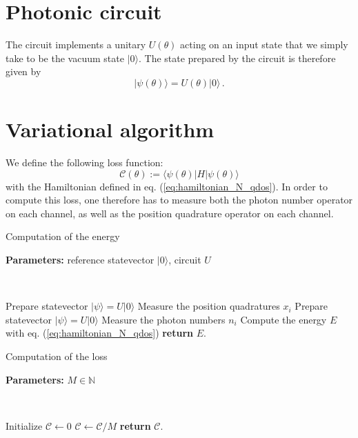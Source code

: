 \documentclass[reprint, amsmath, amssymb, aps]{revtex4-2}
\begin{document}
\section{Photonic circuit}

    The circuit implements a unitary $U(\theta)$ acting on an input state that we simply take to be the vacuum state $|0\rangle$. The state prepared by the circuit is therefore given by
    \begin{equation}
        |\psi(\theta)\rangle = U(\theta)|0\rangle\,.
    \end{equation}

\section{Variational algorithm}

    We define the following loss function:
    \begin{equation}
        \mathcal C(\theta) := \langle\psi(\theta)|H|\psi(\theta)\rangle
    \end{equation}
    with the Hamiltonian defined in eq. (\ref{eq:hamiltonian_N_qdos}).
    In order to compute this loss, one therefore has to measure both the photon number operator on each channel, as well as the position quadrature operator on each channel.
    \newpage

    \begin{algorithm}
        \caption{Computation of the energy}\label{alg:energy_computation}
            \textbf{Parameters:} reference statevector $|0\rangle$, circuit $U$

            \

            Prepare statevector $|\psi\rangle = U|0\rangle$\;
            Measure the position quadratures $x_i$\;
            Prepare statevector $|\psi\rangle = U|0\rangle$\;
            Measure the photon numbers $n_i$\;
            Compute the energy $E$ with eq. (\ref{eq:hamiltonian_N_qdos})\;
            \textbf{return} $E$.
    \end{algorithm}

    \begin{algorithm}
        \caption{Computation of the loss}\label{alg:loss_computation}
            \textbf{Parameters:} $M\in\mathbb N$

            \

            Initialize $\mathcal C \gets 0$\;
                $\mathcal C \gets \mathcal C / M$\;
            \textbf{return} $\mathcal C$.
    \end{algorithm}
\end{document}
